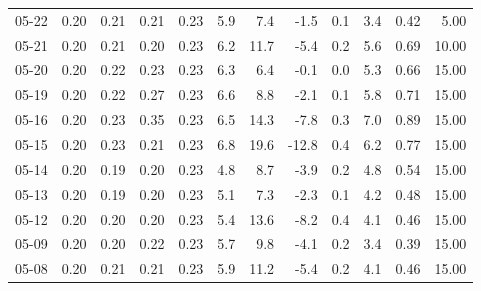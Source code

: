 \begin{threeparttable}
{\begin{tabular}{lrrrrrrrrrrr}
  05-22 &          0.20 &          0.21 &          0.21 &        0.23 &                 5.9 &                 7.4 &       -1.5 &                 0.1 &              3.4 &            0.42 &                   5.00 \\
  05-21 &          0.20 &          0.21 &          0.20 &        0.23 &                 6.2 &                11.7 &       -5.4 &                 0.2 &              5.6 &            0.69 &                  10.00 \\
  05-20 &          0.20 &          0.22 &          0.23 &        0.23 &                 6.3 &                 6.4 &       -0.1 &                 0.0 &              5.3 &            0.66 &                  15.00 \\
  05-19 &          0.20 &          0.22 &          0.27 &        0.23 &                 6.6 &                 8.8 &       -2.1 &                 0.1 &              5.8 &            0.71 &                  15.00 \\
  05-16 &          0.20 &          0.23 &          0.35 &        0.23 &                 6.5 &                14.3 &       -7.8 &                 0.3 &              7.0 &            0.89 &                  15.00 \\
  05-15 &          0.20 &          0.23 &          0.21 &        0.23 &                 6.8 &                19.6 &      -12.8 &                 0.4 &              6.2 &            0.77 &                  15.00 \\
  05-14 &          0.20 &          0.19 &          0.20 &        0.23 &                 4.8 &                 8.7 &       -3.9 &                 0.2 &              4.8 &            0.54 &                  15.00 \\
  05-13 &          0.20 &          0.19 &          0.20 &        0.23 &                 5.1 &                 7.3 &       -2.3 &                 0.1 &              4.2 &            0.48 &                  15.00 \\
  05-12 &          0.20 &          0.20 &          0.20 &        0.23 &                 5.4 &                13.6 &       -8.2 &                 0.4 &              4.1 &            0.46 &                  15.00 \\
  05-09 &          0.20 &          0.20 &          0.22 &        0.23 &                 5.7 &                 9.8 &       -4.1 &                 0.2 &              3.4 &            0.39 &                  15.00 \\
  05-08 &          0.20 &          0.21 &          0.21 &        0.23 &                 5.9 &                11.2 &       -5.4 &                 0.2 &              4.1 &            0.46 &                  15.00 \\

\end{tabular}}
\end{threeparttable}
